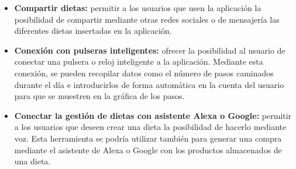 \begin{itemize}
    \item \textbf{Compartir dietas:} permitir a los usuarios que usen la aplicación la posibilidad de compartir mediante otras redes sociales o de mensajería las diferentes dietas insertadas en la aplicación.
    
    \item \textbf{Conexión con pulseras inteligentes:} ofrecer la posibilidad al usuario de conectar una pulsera o reloj inteligente a la aplicación. Mediante esta conexión, se pueden recopilar datos como el número de pasos caminados durante el día e introducirlos de forma automática en la cuenta del usuario para que se muestren en la gráfica de los pasos.
    
    \item \textbf{Conectar la gestión de dietas con asistente Alexa o Google:} permitir a los usuarios que deseen crear una dieta la posibilidad de hacerlo mediante voz. Esta herramienta se podría utilizar también para generar una compra mediante el asistente de Alexa o Google con los productos almacenados de una dieta.
    
\end{itemize}